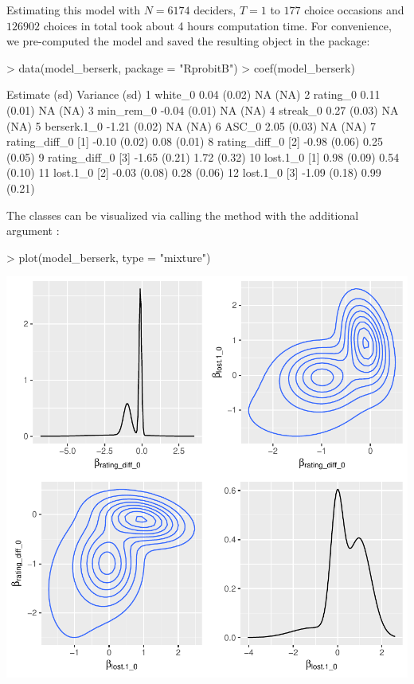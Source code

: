 \documentclass[article,shortnames]{jss}
\newcommand{\fct}[1]{\code{#1()}}
\begin{document}
Estimating this model with $N = 6174$ deciders, $T = 1$ to $177$ choice occasions and $126902$ choices in total took about 4 hours computation time. For convenience, we pre-computed the model and saved the resulting  object in the package:

\begin{Schunk}
\begin{Sinput}
> data(model_berserk, package = "RprobitB")
> coef(model_berserk)
\end{Sinput}
\begin{Soutput}
                     Estimate   (sd) Variance   (sd)
1           white_0      0.04 (0.02)       NA   (NA)
2          rating_0      0.11 (0.01)       NA   (NA)
3         min_rem_0     -0.04 (0.01)       NA   (NA)
4          streak_0      0.27 (0.03)       NA   (NA)
5       berserk.1_0     -1.21 (0.02)       NA   (NA)
6             ASC_0      2.05 (0.03)       NA   (NA)
7  rating_diff_0 [1]    -0.10 (0.02)     0.08 (0.01)
8  rating_diff_0 [2]    -0.98 (0.06)     0.25 (0.05)
9  rating_diff_0 [3]    -1.65 (0.21)     1.72 (0.32)
10      lost.1_0 [1]     0.98 (0.09)     0.54 (0.10)
11      lost.1_0 [2]    -0.03 (0.08)     0.28 (0.06)
12      lost.1_0 [3]    -1.09 (0.18)     0.99 (0.21)
\end{Soutput}
\end{Schunk}

The classes can be visualized via calling the \fct{plot} method with the additional argument :

\begin{Schunk}
\begin{Sinput}
> plot(model_berserk, type = "mixture")
\end{Sinput}
\end{Schunk}
\includegraphics{rprobitb_oelschlaeger_bauer-model-berserk-mixture}
\end{document}
